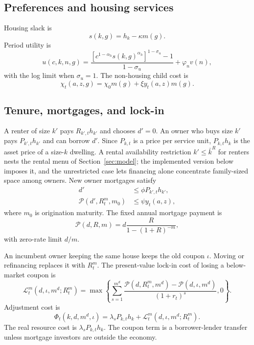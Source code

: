 \documentclass[11pt]{article}
\newcommand{\1}{\mathbf 1}
\begin{document}
\subsection{Preferences and housing services}

Housing slack is
\begin{equation}
s(k,g)=h_k-\kappa m(g).
\end{equation}
Period utility is
\begin{equation}
u(c,k,n,g)=\frac{\left[c^{1-\alpha_h}s(k,g)^{\alpha_h}\right]^{1-\sigma_u}-1}{1-\sigma_u}+\varphi_n v(n),
\label{eq:period_utility_quant}
\end{equation}
with the log limit when $\sigma_u=1$. The non-housing child cost is
\begin{equation}
\chi_t(a,z,g)=\chi_0m(g)+\xi y_t(a,z)m(g).
\label{eq:child_cost_quant}
\end{equation}

\subsection{Tenure, mortgages, and lock-in}

A renter of size $k'$ pays $R_{k',t}h_{k'}$ and chooses $d'=0$. An owner who buys size $k'$ pays $P_{k',t}h_{k'}$ and can borrow $d'$. Since $P_{k,t}$ is a price per service unit, $P_{k,t}h_k$ is the asset price of a size-$k$ dwelling. A rental availability restriction $k'\le\bar k^R$ for renters nests the rental menu of Section~\ref{sec:model}; the implemented version below imposes it, and the unrestricted case lets financing alone concentrate family-sized space among owners. New owner mortgages satisfy
\begin{align}
d'&\le \phi P_{k',t}h_{k'},\label{eq:ltv_quant}\\
\mathcal P(d',R_t^m,m_0)&\le \psi y_t(a,z),\label{eq:pti_quant}
\end{align}
where $m_0$ is origination maturity. The fixed annual mortgage payment is
\begin{equation}
\mathcal P(d,R,m)=d\frac{R}{1-(1+R)^{-m}},
\label{eq:mortgage_payment}
\end{equation}
with zero-rate limit $d/m$.

An incumbent owner keeping the same house keeps the old coupon $\iota$. Moving or refinancing replaces it with $R_t^m$. The present-value lock-in cost of losing a below-market coupon is
\begin{equation}
\mathcal L_t^m(d,\iota,m^d;R_t^m)=\max\left\{\sum_{s=1}^{m^d}\frac{\mathcal P(d,R_t^m,m^d)-\mathcal P(d,\iota,m^d)}{(1+r_t)^s},0\right\}.
\label{eq:pv_lockin_quant}
\end{equation}
Adjustment cost is
\begin{equation}
\Phi_t(k,d,m^d,\iota)=\lambda_s P_{k,t}h_k+\mathcal L_t^m(d,\iota,m^d;R_t^m).
\label{eq:adjustment_quant}
\end{equation}
The real resource cost is $\lambda_sP_{k,t}h_k$. The coupon term is a borrower-lender transfer unless mortgage investors are outside the economy.
\end{document}
